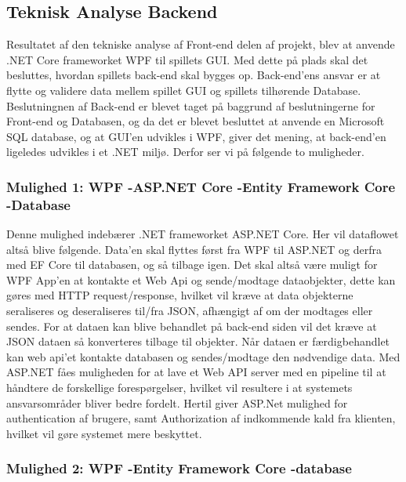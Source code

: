 \subsection{Teknisk Analyse Backend}
\label{ssec: Teknisk Analyse Backend}
Resultatet af den tekniske analyse af Front-end delen af projekt, blev at anvende .NET Core frameworket WPF til spillets GUI. Med dette på plads skal det besluttes, hvordan spillets back-end skal bygges op. Back-end’ens ansvar er at flytte og validere data mellem spillet GUI og spillets tilhørende Database. Beslutningnen af Back-end er blevet taget på baggrund af beslutningerne for Front-end og Databasen, og da det er blevet besluttet at anvende en Microsoft SQL database, og at GUI’en udvikles i WPF, giver det mening, at back-end’en ligeledes udvikles i et .NET miljø. Derfor ser vi på følgende to muligheder.\\


\subsubsection{Mulighed 1: WPF -\g ASP.NET Core -\g Entity Framework Core -\g Database}
Denne mulighed indebærer .NET frameworket ASP.NET Core. Her vil dataflowet altså blive følgende. Data’en skal flyttes først fra WPF til ASP.NET og derfra med EF Core\cite{Entity-Framework-Core} til databasen, og så tilbage igen.
Det skal altså være muligt for WPF App’en at kontakte et Web Api og sende/modtage dataobjekter, dette kan gøres med HTTP request/response, hvilket vil kræve at data objekterne seraliseres og deseraliseres til/fra JSON, afhængigt af om der modtages eller sendes. For at dataen kan blive behandlet på back-end siden vil det kræve at JSON dataen så konverteres tilbage til objekter. Når dataen er færdigbehandlet kan web api’et kontakte databasen og sendes/modtage den nødvendige data. Med ASP.NET fåes muligheden for at lave et Web API server med en pipeline til at håndtere de forskellige forespørgelser, hvilket vil resultere i at systemets ansvarsområder bliver bedre fordelt. Hertil giver ASP.Net mulighed for authentication af brugere, samt Authorization af indkommende kald fra klienten, hvilket vil gøre systemet mere beskyttet. \\


\subsubsection{Mulighed 2: WPF -\g Entity Framework Core -\g database}

